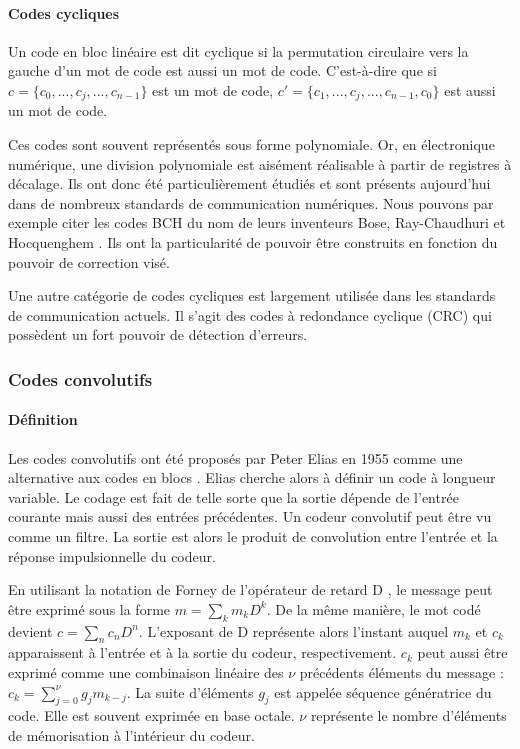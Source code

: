 \paragraph*{Codes cycliques} Un code en bloc linéaire est dit cyclique si la permutation circulaire vers la 
gauche d'un mot de code est aussi un mot de code. C'est-à-dire que si $c = \{c_0, ..., c_j, ..., c_{n-1}\}$ est un mot 
de code, $c' = \{c_1, ..., c_j, ..., c_{n-1}, c_0\}$ est aussi un mot de code.

Ces codes sont souvent représentés sous forme polynomiale. Or, en électronique numérique, une division polynomiale est aisément 
réalisable à partir de registres à décalage. Ils ont donc été particulièrement étudiés et sont présents aujourd'hui dans 
de nombreux standards de communication numériques. Nous pouvons par exemple citer les codes BCH du nom de leurs inventeurs Bose, 
Ray-Chaudhuri et Hocquenghem \cite{bose1960class}. Ils ont la particularité de pouvoir être construits en fonction du pouvoir 
de correction visé.

Une autre catégorie de codes cycliques est largement utilisée dans les standards de communication actuels. Il s'agit des codes à redondance cyclique (CRC) \cite{crc} qui possèdent un fort pouvoir de détection d'erreurs.

\subsubsection{Codes convolutifs}
\paragraph*{Définition}
Les codes convolutifs ont été proposés par Peter Elias en 1955 comme une alternative aux codes en blocs \cite{elias}. 
Elias cherche alors à définir un code à longueur variable. Le codage est fait de telle sorte que la sortie dépende de 
l'entrée courante mais aussi des entrées précédentes. Un codeur convolutif peut être vu comme un filtre. La sortie 
est alors le produit de convolution entre l'entrée et la réponse impulsionnelle du codeur. 

En utilisant la notation de Forney de l'opérateur de retard D \cite{forney1970convolutional}, le message peut être exprimé 
sous la forme $m=\sum_k m_kD^k$. De la même manière, le mot codé devient $c=\sum_n c_nD^n$. L'exposant de D représente 
alors l'instant auquel $m_k$ et $c_k$ apparaissent à l'entrée et à la sortie du codeur, respectivement. $c_k$ peut aussi 
être exprimé comme une combinaison linéaire des $\nu$ précédents éléments du message : $c_k = \sum\limits_{j=0}^\nu g_jm_{k-j}$.
La suite d'éléments $g_j$ est appelée séquence génératrice du code. Elle est souvent exprimée en base octale. $\nu$ représente le 
nombre d'éléments de mémorisation à l'intérieur du codeur.

